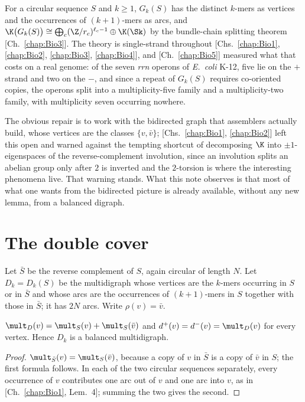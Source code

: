 For a circular sequence $S$ and $k\ge1$, $G_k(S)$ has the distinct $k$-mers as vertices
and the occurrences of $(k{+}1)$-mers as arcs, and
$\K\bigl(G_k(S)\bigr)\cong\bigoplus_c(\Z/r_c)^{\ell_c-1}\oplus\K(\Sk)$ by the bundle-chain
splitting theorem [Ch.~\ref{chap:Bio3}]. The theory is single-strand throughout [Chs.~\ref{chap:Bio1}, \ref{chap:Bio2}, \ref{chap:Bio3}, \ref{chap:Bio4}],
and [Ch.~\ref{chap:Bio5}] measured what that costs on a real genome: of the seven \emph{rrn} operons
of \emph{E.\ coli} K-12, five lie on the $+$ strand and two on the $-$, and since a repeat
of $G_k(S)$ requires co-oriented copies, the operons split into a multiplicity-five family
and a multiplicity-two family, with multiplicity seven occurring nowhere.

The obvious repair is to work with the bidirected graph that assemblers actually build,
whose vertices are the classes $\{v,\bar v\}$; [Chs.~\ref{chap:Bio1}, \ref{chap:Bio2}] left this open and warned
against the tempting shortcut of decomposing $\K$ into $\pm1$-eigenspaces of the
reverse-complement involution, since an involution splits an abelian group only after $2$
is inverted and the $2$-torsion is where the interesting phenomena live. That warning
stands. What this note observes is that most of what one wants from the bidirected picture
is already available, without any new lemma, from a balanced digraph.

\section{The double cover}\label{Bio6:sec:cover}

\begin{definition}\label{Bio6:def:cover}
Let $\bar S$ be the reverse complement of $S$, again circular of length $N$. Let
$D_k=D_k(S)$ be the multidigraph whose vertices are the $k$-mers occurring in $S$ or in
$\bar S$ and whose arcs are the occurrences of $(k{+}1)$-mers in $S$ together with those
in $\bar S$; it has $2N$ arcs. Write $\rho(v)=\bar v$.
\end{definition}

\begin{lemma}[Balance]\label{Bio6:lem:balance}
$\mult_{D}(v)=\mult_S(v)+\mult_S(\bar v)$ and $d^{+}(v)=d^{-}(v)=\mult_D(v)$ for every
vertex. Hence $D_k$ is a balanced multidigraph.
\end{lemma}

\begin{proof}
$\mult_{\bar S}(v)=\mult_S(\bar v)$, because a copy of $v$ in $\bar S$ is a copy of
$\bar v$ in $S$; the first formula follows. In each of the two circular sequences
separately, every occurrence of $v$ contributes one arc out of $v$ and one arc into $v$,
as in [Ch.~\ref{chap:Bio1}, Lem.~4]; summing the two gives the second.
\end{proof}

